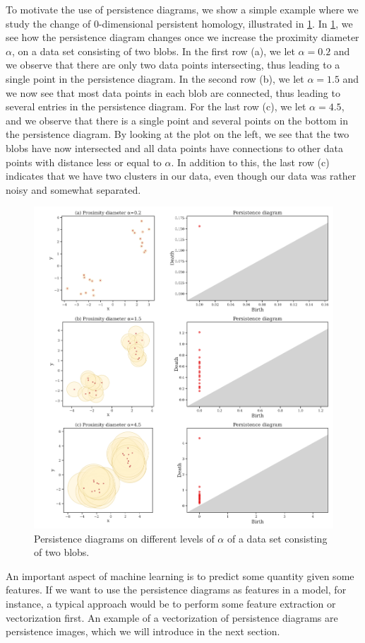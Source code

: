 To motivate the use of persistence diagrams, we show a simple example where we study the change of 0-dimensional persistent homology, illustrated in \cref{fig:persistence-diagram-example}. In \cref{fig:persistence-diagram-example}, we see how the persistence diagram changes once we increase the proximity diameter $\alpha$, on a data set consisting of two blobs. In the first row (a), we let $\alpha=0.2$ and we observe that there are only two data points intersecting, thus leading to a single point in the persistence diagram. In the second row (b), we let $\alpha=1.5$ and we now see that most data points in each blob are connected, thus leading to several entries in the persistence diagram. For the last row (c), we let $\alpha=4.5$, and we observe that there is a single point and several points on the bottom in the persistence diagram. By looking at the plot on the left, we see that the two blobs have now intersected and all data points have connections to other data points with distance less or equal to $\alpha$. In addition to this, the last row (c) indicates that we have two clusters in our data, even though our data was rather noisy and somewhat separated.
\begin{figure}[H]
    \centering
    \includegraphics[width=1\textwidth]{thesis/figures/persistence-diagram-example.pdf}
    \caption{Persistence diagrams on different levels of $\alpha$ of a data set consisting of two blobs.}
    \label{fig:persistence-diagram-example}
\end{figure}
An important aspect of machine learning is to predict some quantity given some features. If we want to use the persistence diagrams as features in a model, for instance, a typical approach would be to perform some feature extraction or vectorization first. An example of a vectorization of persistence diagrams are persistence images, which we will introduce in the next section.

